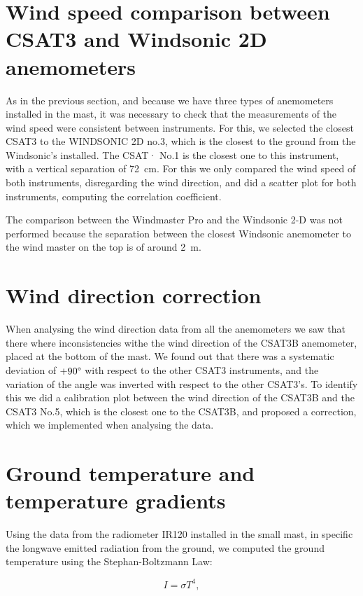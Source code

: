 \section{Wind speed comparison between CSAT3 and Windsonic 2D anemometers}

As in the previous section, and because we have three types of anemometers installed in the mast, it was necessary to check that the measurements of the wind speed were consistent between instruments. For this, we selected the closest CSAT3 to the WINDSONIC 2D no.3, which is the closest to the ground from the Windsonic's installed. The CSAT· No.1 is the closest one to this instrument, with a vertical separation of 72~cm. For this we only compared the wind speed of both instruments, disregarding the wind direction, and did a scatter plot for both instruments, computing the correlation coefficient. 

The comparison between the Windmaster Pro and the Windsonic 2-D was not performed because the separation between the closest Windsonic anemometer to the wind master on the top is of around 2~m. 

\section{Wind direction correction}

When analysing the wind direction data from all the anemometers we saw that there where inconsistencies withe the wind direction of the CSAT3B anemometer, placed at the bottom of the mast. We found out that there was a systematic deviation of $+90\degree$ with respect to the other CSAT3 instruments, and the variation of the angle was inverted with respect to the other CSAT3's. To identify this we did a calibration plot between the wind direction of the CSAT3B and the CSAT3 No.5, which is the closest one to the CSAT3B, and proposed a correction, which we implemented when analysing the data.

\section{Ground temperature and temperature gradients}

Using the data from the radiometer IR120 installed in the small mast, in specific the longwave emitted radiation from the ground, we computed the ground temperature using the Stephan-Boltzmann Law:

\begin{equation}
    I = \sigma T^4, 
\end{equation}

